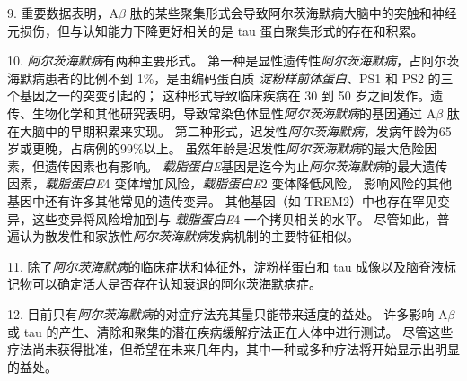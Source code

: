 9. 重要数据表明，A$\beta$ 肽的某些聚集形式会导致阿尔茨海默病大脑中的突触和神经元损伤，但与认知能力下降更好相关的是 tau 蛋白聚集形式的存在和积累。


10. \textit{阿尔茨海默病}有两种主要形式。
第一种是显性遗传性\textit{阿尔茨海默病}，占阿尔茨海默病患者的比例不到 1\%，是由编码蛋白质 \textit{淀粉样前体蛋白}、PS1 和 PS2 的三个基因之一的突变引起的；
这种形式导致临床疾病在 30 到 50 岁之间发作。遗传、生物化学和其他研究表明，导致常染色体显性\textit{阿尔茨海默病}的基因通过 A$\beta$ 肽在大脑中的早期积累来实现。
第二种形式，迟发性\textit{阿尔茨海默病}，发病年龄为65岁或更晚，占病例的99\%以上。
虽然年龄是迟发性\textit{阿尔茨海默病}的最大危险因素，但遗传因素也有影响。 \textit{载脂蛋白E}基因是迄今为止\textit{阿尔茨海默病}的最大遗传因素，\textit{载脂蛋白E}4 变体增加风险，\textit{载脂蛋白E}2 变体降低风险。
影响风险的其他基因中还有许多其他常见的遗传变异。
其他基因（如 TREM2）中也存在罕见变异，这些变异将风险增加到与 \textit{载脂蛋白E}4 一个拷贝相关的水平。
尽管如此，普遍认为散发性和家族性\textit{阿尔茨海默病}发病机制的主要特征相似。


11. 除了\textit{阿尔茨海默病}的临床症状和体征外，淀粉样蛋白和 tau 成像以及脑脊液标记物可以确定活人是否存在认知衰退的阿尔茨海默病症。


12. 目前只有\textit{阿尔茨海默病}的对症疗法充其量只能带来适度的益处。
许多影响 A$\beta$ 或 tau 的产生、清除和聚集的潜在疾病缓解疗法正在人体中进行测试。
尽管这些疗法尚未获得批准，但希望在未来几年内，其中一种或多种疗法将开始显示出明显的益处。


